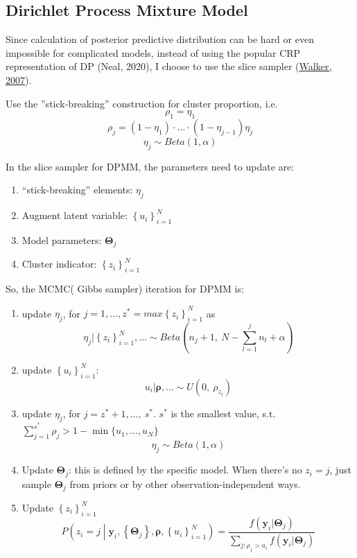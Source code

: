 \documentclass[]{article}
\begin{document}
\subsection{Dirichlet Process Mixture Model}

Since calculation of posterior predictive distribution can be hard or even impossible for complicated models, instead of using the popular CRP representation of DP (Neal, 2020), I choose to use the slice sampler (\href{https://www.tandfonline.com/doi/full/10.1080/03610910601096262}{Walker, 2007}).

Use the ''stick-breaking'' construction for cluster proportion, i.e.
\[\rho_{1} = \eta_{1}\]
\[\rho_{j} = \left( 1 - \eta_{1} \right) \cdot \ldots \cdot \left( 1 - \eta_{j - 1} \right)\eta_{j}\]
\[\eta_{j} \sim Beta(1,\alpha)\]

In the slice sampler for DPMM, the parameters need to update are:
\begin{enumerate}
	\def\labelenumi{(\arabic{enumi})}
	\item
	``stick-breaking'' elements: \(\eta_{j}\)
	\item
	Augment latent variable: \(\left\{ u_{i} \right\}_{i = 1}^{N}\)
	\item
	Model parameters: \(\mathbf{\Theta}_{j}\)
	\item
	Cluster indicator: \(\left\{ z_{i} \right\}_{i = 1}^{N}\)
\end{enumerate}

So, the MCMC( Gibbs sampler) iteration for DPMM is:
\begin{enumerate}
	\def\labelenumi{(\arabic{enumi})}
	\item
	update \(\eta_{j}\), for
	\(j = 1,\ldots,{{z^{*} = max}\left\{ z_{i} \right\}}_{i = 1}^{N}\) as
	\[\eta_{j}|\left\{ z_{i} \right\}_{i = 1}^{N},\ldots \sim Beta(n_{j} + 1,\ N - \sum_{l = 1}^{j}n_{l} + \alpha)\]
	\item
	update \(\left\{ u_{i} \right\}_{i = 1}^{N}\):
	\[u_{i}|\mathbf{\rho,\ldots} \sim U(0,\ \rho_{z_{i}})\]
	\item
	update \(\eta_{j}\), for \(j = z^{*} + 1,\ldots,\ s^{*}\). \(s^{*}\)
	is the smallest value, s.t.
	\(\sum_{j = 1}^{s^{*}}\rho_{j} > 1 - \min{\{ u_{1},\ldots,u_{N}\}}\)
	\[\eta_{j} \sim Beta(1,\alpha)\]
	\item
	Update \(\mathbf{\Theta}_{j}\): this is defined by the specific model. When there's no
	\(z_{i} = j\), just sample \(\mathbf{\Theta}_{j}\) from priors or by other observation-independent ways.
	\item
	Update \(\left\{ z_{i} \right\}_{i = 1}^{N}\)
	\[P\left( z_{i} = j \middle| \mathbf{y}_{i},\left\{ \mathbf{\Theta}_{j} \right\},\mathbf{\rho,}\left\{ u_{i} \right\}_{i = 1}^{N} \right) = \frac{f\left( \mathbf{y}_{i}|\mathbf{\Theta}_{j} \right)}{\sum_{j:\rho_{j} > u_{i}}^{}{f\left( \mathbf{y}_{i}|\mathbf{\Theta}_{j} \right)}}\]
\end{enumerate}
\end{document}
